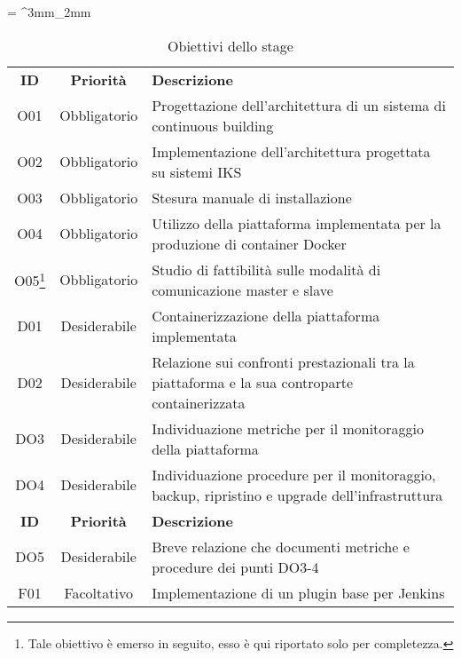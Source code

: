 \tabulinesep = ^3mm_2mm
\begin{longtabu} to \textwidth {ccX}
    \caption[Obiettivi dello stage]{Obiettivi dello stage}
    \label{tab:obiettivi-iniziali}
    \endlastfoot
    \rowfont{\bfseries\sffamily\leavevmode\color{white}}
    \textbf{ID} & \textbf{Priorità} & \textbf{Descrizione} \\
    O01 & Obbligatorio & Progettazione dell’architettura di un sistema di \gls{continuous building} \\ %
    O02 & Obbligatorio & Implementazione dell’architettura progettata su sistemi IKS \\ %
    O03 & Obbligatorio & Stesura manuale di installazione \\ %
    O04 & Obbligatorio & Utilizzo della piattaforma implementata per la produzione di \gls{container} Docker \\ %
    O05\footnote{Tale obiettivo è emerso in seguito, esso è qui riportato solo per completezza.} & Obbligatorio & Studio di fattibilità sulle modalità di comunicazione \gls{master} e \gls{slave} \\ %
    D01 & Desiderabile & Containerizzazione della piattaforma implementata \\ %
    D02 & Desiderabile & Relazione sui confronti prestazionali tra la piattaforma e la sua controparte containerizzata \\ %
    DO3 & Desiderabile & Individuazione metriche per il monitoraggio della piattaforma \\ %
    DO4 & Desiderabile &  Individuazione procedure per il monitoraggio, backup, ripristino e upgrade dell’infrastruttura \\ %
    \newpage
    \rowfont{\bfseries\sffamily\leavevmode\color{white}}
    \textbf{ID} & \textbf{Priorità} & \textbf{Descrizione} \\
    DO5 & Desiderabile & Breve relazione che documenti metriche e procedure dei punti DO3-4 \\ %
    F01 & Facoltativo & Implementazione di un plugin base per Jenkins \\ %
\end{longtabu}